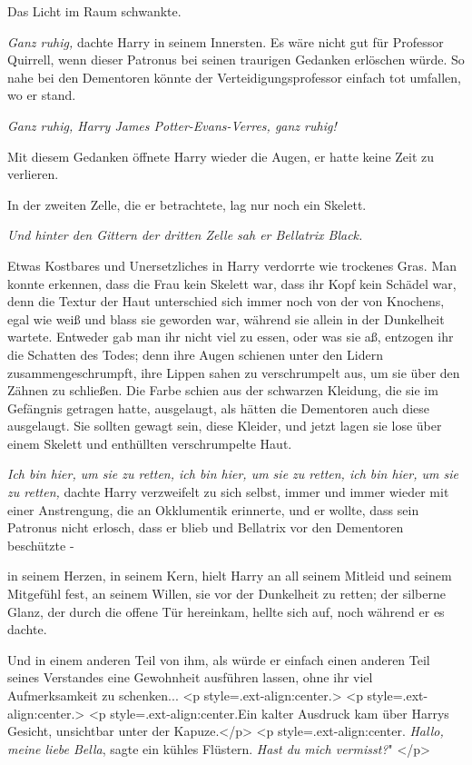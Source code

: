 Das Licht im Raum schwankte.

\emph{Ganz ruhig,} dachte Harry in seinem Innersten. Es wäre nicht gut für
Professor Quirrell, wenn dieser Patronus bei seinen traurigen Gedanken erlöschen
würde. So nahe bei den Dementoren könnte der Verteidigungsprofessor einfach tot
umfallen, wo er stand.

\emph{Ganz ruhig, Harry James Potter-Evans-Verres, ganz ruhig!}

Mit diesem Gedanken öffnete Harry wieder die Augen, er hatte keine Zeit zu
verlieren.

In der zweiten Zelle, die er betrachtete, lag nur noch ein Skelett.

\emph{Und hinter den Gittern der dritten Zelle sah er Bellatrix Black.}

Etwas Kostbares und Unersetzliches in Harry verdorrte wie trockenes Gras. Man
konnte erkennen, dass die Frau kein Skelett war, dass ihr Kopf kein Schädel war,
denn die Textur der Haut unterschied sich immer noch von der von Knochens, egal
wie weiß und blass sie geworden war, während sie allein in der Dunkelheit
wartete. Entweder gab man ihr nicht viel zu essen, oder was sie aß, entzogen ihr
die Schatten des Todes; denn ihre Augen schienen unter den Lidern
zusammengeschrumpft, ihre Lippen sahen zu verschrumpelt aus, um sie über den
Zähnen zu schließen. Die Farbe schien aus der schwarzen Kleidung, die sie im
Gefängnis getragen hatte, ausgelaugt, als hätten die Dementoren auch diese
ausgelaugt. Sie sollten gewagt sein, diese Kleider, und jetzt lagen sie lose
über einem Skelett und enthüllten verschrumpelte Haut.

\emph{Ich bin hier, um sie zu retten, ich bin hier, um sie zu retten, ich bin
hier, um sie zu retten,} dachte Harry verzweifelt zu sich selbst, immer und
immer wieder mit einer Anstrengung, die an Okklumentik erinnerte, und er wollte,
dass sein Patronus nicht erlosch, dass er blieb und Bellatrix vor den Dementoren
beschützte -

in seinem Herzen, in seinem Kern, hielt Harry an all seinem Mitleid und seinem
Mitgefühl fest, an seinem Willen, sie vor der Dunkelheit zu retten; der silberne
Glanz, der durch die offene Tür hereinkam, hellte sich auf, noch während er es
dachte.

Und in einem anderen Teil von ihm, als würde er einfach einen anderen Teil
seines Verstandes eine Gewohnheit ausführen lassen, ohne ihr viel Aufmerksamkeit
zu schenken... <p style=\grqq{}.ext-align:center\grqq{}.> <p
style=\grqq{}.ext-align:center\grqq{}.> <p
style=\grqq{}.ext-align:center\grqq{}.Ein kalter Ausdruck kam über Harrys
Gesicht, unsichtbar unter der Kapuze.</p> <p
style=\grqq{}.ext-align:center\grqq{}. \glqq \emph{Hallo, meine liebe
Bella}\grqq{}, sagte ein kühles Flüstern. \glqq \emph{Hast du mich vermisst?}"
</p>

